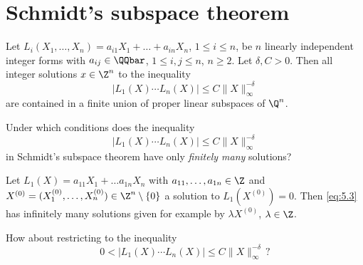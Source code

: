 \section{Schmidt's subspace theorem}

\begin{thm}[Schmidt, 1972]\label{thm:5.13} 
	Let \( L_i(X_1, \dotsc, X_n) = a_{i1} X_1 + \dots + a_{in} X_n \), \( 1 \leq i \leq n \), be \( n \) linearly independent integer forms with \( a_{ij} \in \QQbar \), \( 1 \leq i, j \leq n \), \( n \geq 2 \).
	Let \( \delta, C > 0 \).
	Then all integer solutions \( x \in \Z^n \) to the inequality
	\[ |L_1(X) \dotsm L_n(X)| \leq C \|X\|_\infty^{-\delta} \]
	are contained in a finite union of proper linear subspaces of \( \Q^n \).
\end{thm}


\begin{frage*}
	Under which conditions does the inequality
	\begin{equation}\label{eq:5.3}
		|L_1(X) \dotsm L_n(X)| \leq C \|X\|_\infty^{-\delta}
	\end{equation}
	in Schmidt's subspace theorem have only \emph{finitely many} solutions?
\end{frage*}

\begin{exmp*}
	Let \( L_1(X) = a_{11} X_1 + \dots a_{1n} X_n \) with \( a_{11}, \dotsc, a_{1n} \in \Z \) and \( X^{(0)} = (X_1^{(0)}, \dotsc, X_n^{(0)}) \in \Z^n \setminus \{0\} \) a solution to \( L_1(X^{(0)}) = 0 \).
	Then \eqref{eq:5.3} has infinitely many solutions given for example by \( \lambda X^{(0)} \), \( \lambda \in \Z \).
\end{exmp*}

\begin{frage*}
	How about restricting to the inequality
	\[ 0 < |L_1(X) \dotsm L_n(X)| \leq C \|X\|_\infty^{-\delta} \,? \]
\end{frage*}